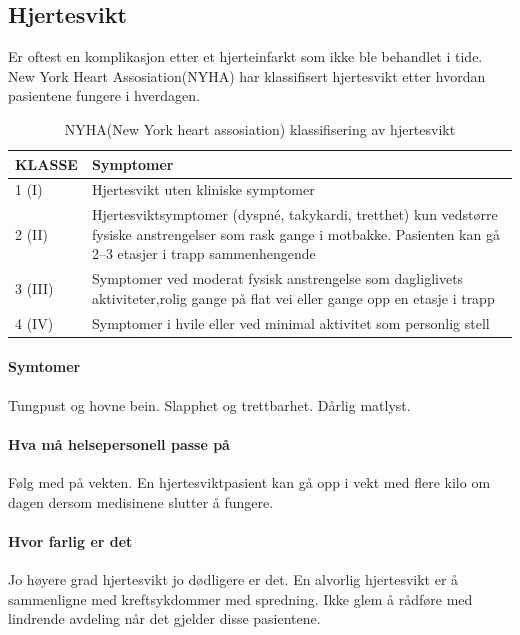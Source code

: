 			\subsection{Hjertesvikt}
				Er oftest en komplikasjon etter et hjerteinfarkt som ikke ble behandlet i tide. New York Heart Assosiation(NYHA) har klassifisert hjertesvikt etter hvordan pasientene fungere i hverdagen. 
					\begin{table}[ht]
						\caption{NYHA(New York heart assosiation) klassifisering av hjertesvikt}
						\centering
						\begin{tabular}{|p{2cm}| p{11cm}|}
							\hline
							\textbf{KLASSE} & \textbf{Symptomer}\\[0.75pt]
							\hline
							1 (I) & Hjertesvikt uten kliniske symptomer\\
							\hline
							2 (II) & Hjertesviktsymptomer (dyspné, takykardi, tretthet) kun ved\newline større fysiske anstrengelser som rask gange i motbakke. \newline Pasienten kan gå 2–3 etasjer i trapp sammenhengende\\
							\hline
							3 (III) & Symptomer ved moderat fysisk anstrengelse som dagliglivets aktiviteter,\newline rolig gange på flat vei eller gange opp en etasje i trapp\\
							\hline
							4 (IV) & Symptomer i hvile eller ved minimal aktivitet som personlig stell \\
							\hline
						\end{tabular}
					\end{table}
				\paragraph{Symtomer\\}
					Tungpust og hovne bein. Slapphet og trettbarhet. Dårlig matlyst.
				\paragraph{Hva må helsepersonell passe på\\}
					Følg med på vekten. En hjertesviktpasient kan gå opp i vekt med flere kilo om dagen dersom medisinene slutter å fungere. 
				\paragraph{Hvor farlig er det\\}
					Jo høyere grad hjertesvikt jo dødligere er det. En alvorlig hjertesvikt er å sammenligne med kreftsykdommer med spredning. Ikke glem å rådføre med lindrende avdeling når det gjelder disse pasientene.
